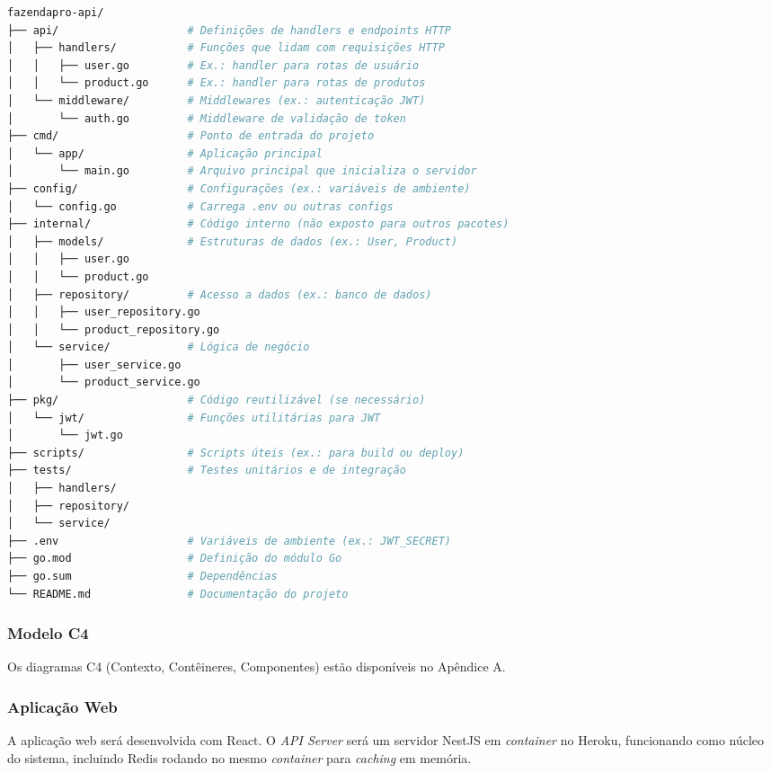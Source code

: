 \documentclass[12pt, a4paper]{article}
\begin{document}
\begin{lstlisting}[language=bash, caption={Estrutura de Diretórios do Projeto}]
fazendapro-api/
├── api/                    # Definições de handlers e endpoints HTTP
│   ├── handlers/           # Funções que lidam com requisições HTTP
│   │   ├── user.go         # Ex.: handler para rotas de usuário
│   │   └── product.go      # Ex.: handler para rotas de produtos
│   └── middleware/         # Middlewares (ex.: autenticação JWT)
│       └── auth.go         # Middleware de validação de token
├── cmd/                    # Ponto de entrada do projeto
│   └── app/                # Aplicação principal
│       └── main.go         # Arquivo principal que inicializa o servidor
├── config/                 # Configurações (ex.: variáveis de ambiente)
│   └── config.go           # Carrega .env ou outras configs
├── internal/               # Código interno (não exposto para outros pacotes)
│   ├── models/             # Estruturas de dados (ex.: User, Product)
│   │   ├── user.go
│   │   └── product.go
│   ├── repository/         # Acesso a dados (ex.: banco de dados)
│   │   ├── user_repository.go
│   │   └── product_repository.go
│   └── service/            # Lógica de negócio
│       ├── user_service.go
│       └── product_service.go
├── pkg/                    # Código reutilizável (se necessário)
│   └── jwt/                # Funções utilitárias para JWT
│       └── jwt.go
├── scripts/                # Scripts úteis (ex.: para build ou deploy)
├── tests/                  # Testes unitários e de integração
│   ├── handlers/
│   ├── repository/
│   └── service/
├── .env                    # Variáveis de ambiente (ex.: JWT_SECRET)
├── go.mod                  # Definição do módulo Go
├── go.sum                  # Dependências
└── README.md               # Documentação do projeto
\end{lstlisting}

\subsubsection{Modelo C4}
\begin{spacing}{1.5}
Os diagramas C4 (Contexto, Contêineres, Componentes) estão disponíveis no Apêndice A.
\end{spacing}

\subsubsection{Aplicação Web}
\begin{spacing}{1.5}
A aplicação web será desenvolvida com React. O \textit{API Server} será um servidor NestJS em \textit{container} no Heroku, funcionando como núcleo do sistema, incluindo Redis rodando no mesmo \textit{container} para \textit{caching} em memória.
\end{spacing}
\end{document}
